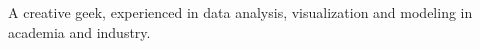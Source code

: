 
A creative geek, experienced in data analysis, visualization and modeling in academia and industry.




